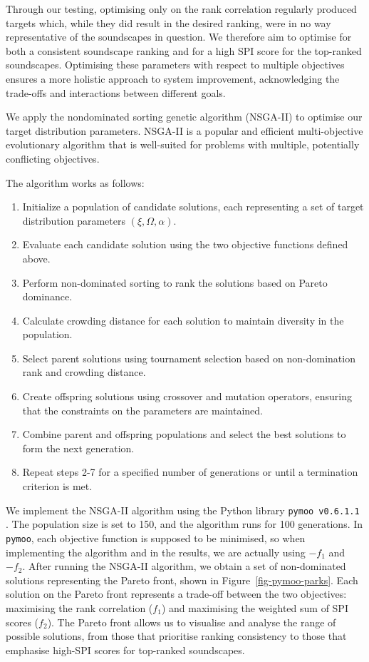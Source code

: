 \documentclass[
  authoryear,
  preprint,
  3p]{elsarticle}
\providecommand{\tightlist}{%
  \setlength{\itemsep}{0pt}\setlength{\parskip}{0pt}}\usepackage{longtable,booktabs,array}
\begin{document}
Through our testing, optimising only on the rank correlation regularly
produced targets which, while they did result in the desired ranking,
were in no way representative of the soundscapes in question. We
therefore aim to optimise for both a consistent soundscape ranking and
for a high SPI score for the top-ranked soundscapes. Optimising these
parameters with respect to multiple objectives ensures a more holistic
approach to system improvement, acknowledging the trade-offs and
interactions between different goals.

We apply the nondominated sorting genetic algorithm (NSGA-II)
\citep{Deb2002fast} to optimise our target distribution parameters.
NSGA-II is a popular and efficient multi-objective evolutionary
algorithm that is well-suited for problems with multiple, potentially
conflicting objectives.

The algorithm works as follows:

\begin{enumerate}
\def\labelenumi{\arabic{enumi}.}
\tightlist
\item
  Initialize a population of candidate solutions, each representing a
  set of target distribution parameters \((\xi, \Omega, \alpha)\).
\item
  Evaluate each candidate solution using the two objective functions
  defined above.
\item
  Perform non-dominated sorting to rank the solutions based on Pareto
  dominance.
\item
  Calculate crowding distance for each solution to maintain diversity in
  the population.
\item
  Select parent solutions using tournament selection based on
  non-domination rank and crowding distance.
\item
  Create offspring solutions using crossover and mutation operators,
  ensuring that the constraints on the parameters are maintained.
\item
  Combine parent and offspring populations and select the best solutions
  to form the next generation.
\item
  Repeat steps 2-7 for a specified number of generations or until a
  termination criterion is met.
\end{enumerate}

We implement the NSGA-II algorithm using the Python library
\texttt{pymoo\ v0.6.1.1} \citep{pymoo}. The population size is set to
150, and the algorithm runs for 100 generations. In \texttt{pymoo}, each
objective function is supposed to be minimised, so when implementing the
algorithm and in the results, we are actually using \(-f_1\) and
\(-f_2\). After running the NSGA-II algorithm, we obtain a set of
non-dominated solutions representing the Pareto front, shown in
Figure~\ref{fig-pymoo-parks}. Each solution on the Pareto front
represents a trade-off between the two objectives: maximising the rank
correlation (\(f_1\)) and maximising the weighted sum of SPI scores
(\(f_2\)). The Pareto front allows us to visualise and analyse the range
of possible solutions, from those that prioritise ranking consistency to
those that emphasise high-SPI scores for top-ranked soundscapes.
\end{document}
